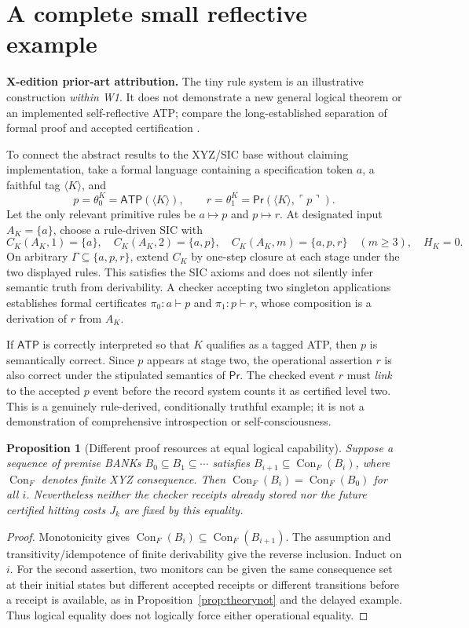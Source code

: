\documentclass[11pt,letterpaper]{article}
\newcommand{\PriorArtNote}[1]{%
\par\smallskip\noindent\begin{minipage}{\linewidth}\small\color{black!85}%
\textbf{X-edition prior-art attribution.} #1\end{minipage}\par\smallskip}
\newtheorem{proposition}[theorem]{Proposition}
\newcommand{\Prv}{\mathsf{Pr}}
\newcommand{\ATP}{\mathsf{ATP}}
\begin{document}
\section{A complete small reflective example}
\PriorArtNote{The tiny rule system is an illustrative construction \emph{within W1}. It does not demonstrate a new general logical theorem or an implemented self-reflective ATP; compare the long-established separation of formal proof and accepted certification \cite{godel,necula}.}
To connect the abstract results to the XYZ/SIC base without claiming implementation, take a formal language containing a specification token $a$, a faithful tag $\langle K\rangle$, and
\[
 p=\theta_0^K=\ATP(\langle K\rangle),\qquad
 r=\theta_1^K=\Prv(\langle K\rangle,\ulcorner p\urcorner).
\]
Let the only relevant primitive rules be $a\mapsto p$ and $p\mapsto r$. At designated input $A_K=\{a\}$, choose a rule-driven SIC with
\[
 C_K(A_K,1)=\{a\},\quad C_K(A_K,2)=\{a,p\},\quad
 C_K(A_K,m)=\{a,p,r\}\quad(m\ge3),\quad H_K=0.
\]
On arbitrary $\Gamma\subseteq\{a,p,r\}$, extend $C_K$ by one-step closure at each stage under the two displayed rules. This satisfies the SIC axioms and does not silently infer semantic truth from derivability. A checker accepting two singleton applications establishes formal certificates $\pi_0:a\vdash p$ and $\pi_1:p\vdash r$, whose composition is a derivation of $r$ from $A_K$.

If $\ATP$ is correctly interpreted so that $K$ qualifies as a tagged ATP, then $p$ is semantically correct. Since $p$ appears at stage two, the operational assertion $r$ is also correct under the stipulated semantics of $\Prv$. The checked event $r$ must \emph{link} to the accepted $p$ event before the record system counts it as certified level two. This is a genuinely rule-derived, conditionally truthful example; it is not a demonstration of comprehensive introspection or self-consciousness.

\begin{proposition}[Different proof resources at equal logical capability]\label{prop:bank}
Suppose a sequence of premise BANKs $B_0\subseteq B_1\subseteq\cdots$ satisfies $B_{i+1}\subseteq\operatorname{Con}_F(B_i)$, where $\operatorname{Con}_F$ denotes finite XYZ consequence. Then $\operatorname{Con}_F(B_i)=\operatorname{Con}_F(B_0)$ for all $i$. Nevertheless neither the checker receipts already stored nor the future certified hitting costs $J_k$ are fixed by this equality.
\end{proposition}
\begin{proof}
Monotonicity gives $\operatorname{Con}_F(B_i)\subseteq\operatorname{Con}_F(B_{i+1})$. The assumption and transitivity/idempotence of finite derivability give the reverse inclusion. Induct on $i$. For the second assertion, two monitors can be given the same consequence set at their initial states but different accepted receipts or different transitions before a receipt is available, as in Proposition~\ref{prop:theorynot} and the delayed example. Thus logical equality does not logically force either operational equality.
\end{proof}
\end{document}
